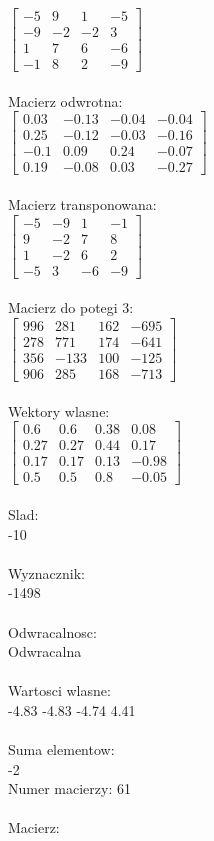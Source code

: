 \documentclass[a4paper,12pt]{article}
\begin{document}
$\begin{bmatrix} -5&9&1&-5\\-9&-2&-2&3\\1&7&6&-6\\-1&8&2&-9 \end{bmatrix}$
\\
\\
Macierz odwrotna:\\

$\begin{bmatrix} 0.03&-0.13&-0.04&-0.04\\0.25&-0.12&-0.03&-0.16\\-0.1&0.09&0.24&-0.07\\0.19&-0.08&0.03&-0.27 \end{bmatrix}$
\\
\\
Macierz transponowana:\\

$\begin{bmatrix} -5&-9&1&-1\\9&-2&7&8\\1&-2&6&2\\-5&3&-6&-9 \end{bmatrix}$
\\
\\
Macierz do potegi 3:\\

$\begin{bmatrix} 996&281&162&-695\\278&771&174&-641\\356&-133&100&-125\\906&285&168&-713 \end{bmatrix}$
\\
\\
Wektory wlasne:\\

$\begin{bmatrix} 0.6&0.6&0.38&0.08\\0.27&0.27&0.44&0.17\\0.17&0.17&0.13&-0.98\\0.5&0.5&0.8&-0.05 \end{bmatrix}$
\\
\\
Slad:\\
-10
\\
\\
Wyznacznik:\\
-1498
\\
\\
Odwracalnosc:\\
Odwracalna
\\
\\
Wartosci wlasne:\\
-4.83 -4.83 -4.74 4.41
\\
\\
Suma elementow:\\
-2
\\
\newpage
Numer macierzy:
61
\\
\\
Macierz:\\
\end{document}
